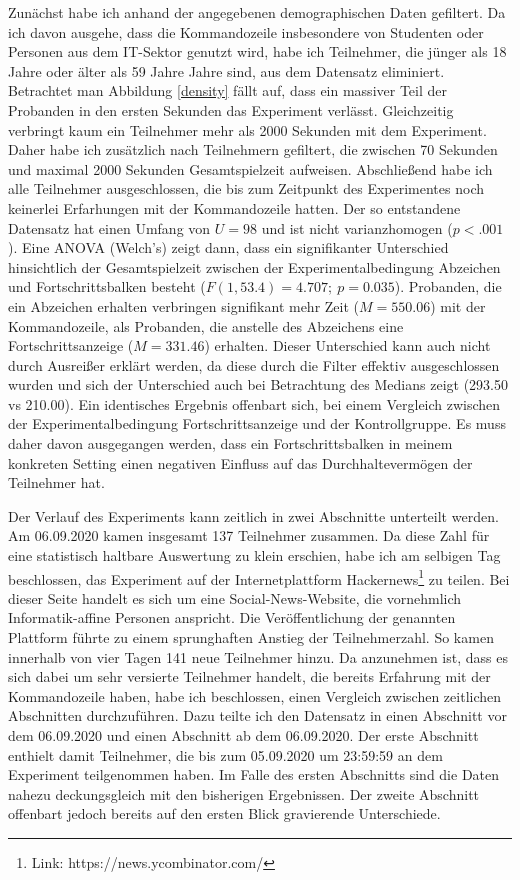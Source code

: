 Zunächst habe ich anhand der angegebenen demographischen Daten gefiltert. Da ich davon ausgehe, dass die Kommandozeile insbesondere von Studenten oder Personen aus dem IT-Sektor genutzt wird, habe ich Teilnehmer, die jünger als 18 Jahre oder älter als 59 Jahre Jahre sind, aus dem Datensatz eliminiert. Betrachtet man Abbildung \ref{density} fällt auf, dass ein massiver Teil der Probanden in den ersten Sekunden das Experiment verlässt. Gleichzeitig verbringt kaum ein Teilnehmer mehr als 2000 Sekunden mit dem Experiment. Daher habe ich zusätzlich nach Teilnehmern gefiltert, die zwischen 70 Sekunden und maximal 2000 Sekunden Gesamtspielzeit aufweisen. Abschließend habe ich alle Teilnehmer ausgeschlossen, die bis zum Zeitpunkt des Experimentes noch keinerlei Erfarhungen mit der Kommandozeile hatten. Der so entstandene Datensatz hat einen Umfang von $U=98$ und ist nicht varianzhomogen ($p<.001$). Eine ANOVA (Welch's) zeigt dann, dass ein signifikanter Unterschied hinsichtlich der Gesamtspielzeit zwischen der Experimentalbedingung Abzeichen und Fortschrittsbalken besteht ($F(1,53.4)=4.707; \: p=0.035$). Probanden, die ein Abzeichen erhalten verbringen signifikant mehr Zeit ($M=550.06$) mit der Kommandozeile, als Probanden, die anstelle des Abzeichens eine Fortschrittsanzeige ($M=331.46$) erhalten. Dieser Unterschied kann auch nicht durch Ausreißer erklärt werden, da diese durch die Filter effektiv ausgeschlossen wurden und sich der Unterschied auch bei Betrachtung des Medians zeigt (293.50 vs 210.00). Ein identisches Ergebnis offenbart sich, bei einem Vergleich zwischen der Experimentalbedingung Fortschrittsanzeige und der Kontrollgruppe. Es muss daher davon ausgegangen werden, dass ein Fortschrittsbalken in meinem konkreten Setting einen negativen Einfluss auf das Durchhaltevermögen der Teilnehmer hat.

Der Verlauf des Experiments kann zeitlich in zwei Abschnitte unterteilt werden. Am 06.09.2020 kamen insgesamt 137 Teilnehmer zusammen. Da diese Zahl für eine statistisch haltbare Auswertung zu klein erschien, habe ich am selbigen Tag beschlossen, das Experiment auf der Internetplattform Hackernews\footnote{Link: https://news.ycombinator.com/} zu teilen. Bei dieser Seite handelt es sich um eine Social-News-Website, die vornehmlich Informatik-affine Personen anspricht. Die Veröffentlichung der genannten Plattform führte zu einem sprunghaften Anstieg der Teilnehmerzahl. So kamen innerhalb von vier Tagen 141 neue Teilnehmer hinzu. Da anzunehmen ist, dass es sich dabei um sehr versierte Teilnehmer handelt, die bereits Erfahrung mit der Kommandozeile haben, habe ich beschlossen, einen Vergleich zwischen zeitlichen Abschnitten durchzuführen. Dazu teilte ich den Datensatz in einen Abschnitt vor dem 06.09.2020 und einen Abschnitt ab dem 06.09.2020. Der erste Abschnitt enthielt damit Teilnehmer, die bis zum 05.09.2020 um 23:59:59 an dem Experiment teilgenommen haben. Im Falle des ersten Abschnitts sind die Daten nahezu deckungsgleich mit den bisherigen Ergebnissen. Der zweite Abschnitt offenbart jedoch bereits auf den ersten Blick gravierende Unterschiede.

